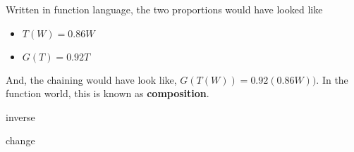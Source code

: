 \documentclass{ximera}
\begin{document}
Written in function language, the two proportions would have looked like

\begin{itemize}
\item $T(W) = 0.86 W$
\item $G(T) = 0.92 T$
\end{itemize} 

And, the chaining would have look like, $G(T(W)) = 0.92 (0.86 W))$.  In the function world, this is known as \textbf{composition}.












inverse


change
\end{document}
